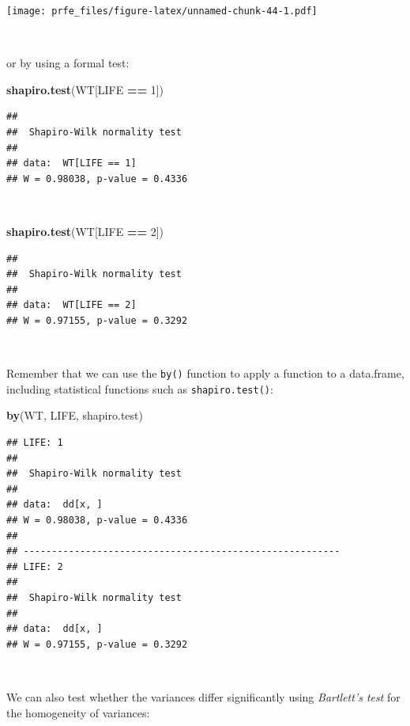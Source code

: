 \documentclass[12pt,a4paper]{book}
\newenvironment{Shaded}{\begin{snugshade}}{\end{snugshade}}
\newcommand{\KeywordTok}[1]{\textcolor[rgb]{0.13,0.29,0.53}{\textbf{#1}}}
\newcommand{\DecValTok}[1]{\textcolor[rgb]{0.00,0.00,0.81}{#1}}
\newcommand{\StringTok}[1]{\textcolor[rgb]{0.31,0.60,0.02}{#1}}
\newcommand{\OperatorTok}[1]{\textcolor[rgb]{0.81,0.36,0.00}{\textbf{#1}}}
\newcommand{\NormalTok}[1]{#1}
\theoremstyle{definition}
\theoremstyle{definition}
\theoremstyle{definition}
\theoremstyle{remark}
\begin{document}
\texttt{[image: prfe\_files/figure-latex/unnamed-chunk-44-1.pdf]}

~

or by using a formal test:

\begin{Shaded}
\begin{Highlighting}[]
\KeywordTok{shapiro.test}\NormalTok{(WT[LIFE }\OperatorTok{==}\StringTok{ }\DecValTok{1}\NormalTok{])}
\end{Highlighting}
\end{Shaded}

\begin{verbatim}
## 
##  Shapiro-Wilk normality test
## 
## data:  WT[LIFE == 1]
## W = 0.98038, p-value = 0.4336
\end{verbatim}

~

\begin{Shaded}
\begin{Highlighting}[]
\KeywordTok{shapiro.test}\NormalTok{(WT[LIFE }\OperatorTok{==}\StringTok{ }\DecValTok{2}\NormalTok{])}
\end{Highlighting}
\end{Shaded}

\begin{verbatim}
## 
##  Shapiro-Wilk normality test
## 
## data:  WT[LIFE == 2]
## W = 0.97155, p-value = 0.3292
\end{verbatim}

~

Remember that we can use the \texttt{by()} function to apply a function
to a data.frame, including statistical functions such as
\texttt{shapiro.test()}:

\begin{Shaded}
\begin{Highlighting}[]
\KeywordTok{by}\NormalTok{(WT, LIFE, shapiro.test)}
\end{Highlighting}
\end{Shaded}

\begin{verbatim}
## LIFE: 1
## 
##  Shapiro-Wilk normality test
## 
## data:  dd[x, ]
## W = 0.98038, p-value = 0.4336
## 
## -------------------------------------------------------- 
## LIFE: 2
## 
##  Shapiro-Wilk normality test
## 
## data:  dd[x, ]
## W = 0.97155, p-value = 0.3292
\end{verbatim}

~

We can also test whether the variances differ significantly using
\emph{Bartlett's test} for the homogeneity of variances:
\end{document}
